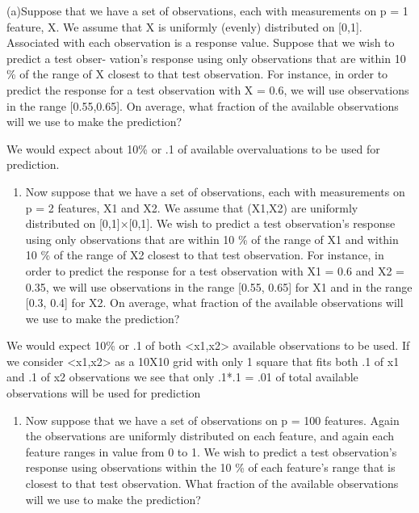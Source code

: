 \documentclass[]{article}
\providecommand{\tightlist}{%
  \setlength{\itemsep}{0pt}\setlength{\parskip}{0pt}}
\begin{document}
(a)Suppose that we have a set of observations, each with measurements on
p = 1 feature, X. We assume that X is uniformly (evenly) distributed on
{[}0,1{]}. Associated with each observation is a response value. Suppose
that we wish to predict a test obser- vation's response using only
observations that are within 10 \% of the range of X closest to that
test observation. For instance, in order to predict the response for a
test observation with X = 0.6, we will use observations in the range
{[}0.55,0.65{]}. On average, what fraction of the available observations
will we use to make the prediction?

We would expect about 10\% or .1 of available overvaluations to be used
for prediction.

\begin{enumerate}
\def\labelenumi{(\alph{enumi})}
\setcounter{enumi}{1}
\tightlist
\item
  Now suppose that we have a set of observations, each with measurements
  on p = 2 features, X1 and X2. We assume that (X1,X2) are uniformly
  distributed on {[}0,1{]}×{[}0,1{]}. We wish to predict a test
  observation's response using only observations that are within 10 \%
  of the range of X1 and within 10 \% of the range of X2 closest to that
  test observation. For instance, in order to predict the response for a
  test observation with X1 = 0.6 and X2 = 0.35, we will use observations
  in the range {[}0.55, 0.65{]} for X1 and in the range {[}0.3, 0.4{]}
  for X2. On average, what fraction of the available observations will
  we use to make the prediction?
\end{enumerate}

We would expect 10\% or .1 of both \textless{}x1,x2\textgreater{}
available observations to be used. If we consider
\textless{}x1,x2\textgreater{} as a 10X10 grid with only 1 square that
fits both .1 of x1 and .1 of x2 observations we see that only .1*.1 =
.01 of total available observations will be used for prediction

\begin{enumerate}
\def\labelenumi{(\alph{enumi})}
\setcounter{enumi}{2}
\tightlist
\item
  Now suppose that we have a set of observations on p = 100 features.
  Again the observations are uniformly distributed on each feature, and
  again each feature ranges in value from 0 to 1. We wish to predict a
  test observation's response using observations within the 10 \% of
  each feature's range that is closest to that test observation. What
  fraction of the available observations will we use to make the
  prediction?
\end{enumerate}
\end{document}

